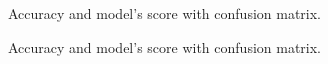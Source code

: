 \begin{figure}[H]
	\centering
	\caption{Accuracy and model's score with confusion matrix.}
	\label{fig:c4_1}
\end{figure}
\begin{figure}[H]
	\centering
	\caption{Accuracy and model's score with confusion matrix.}
	\label{fig:c4_2}
\end{figure}
